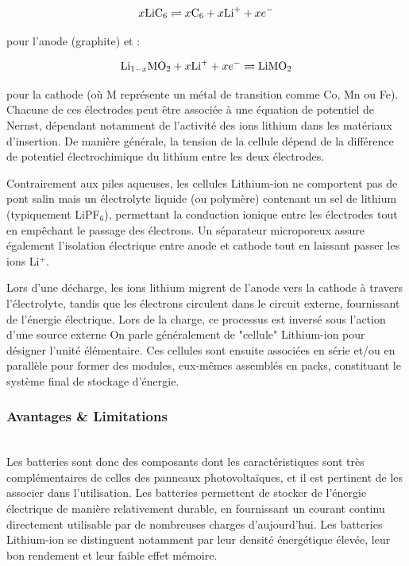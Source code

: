 \begin{equation}
    x\ce{LiC}_6 \rightleftharpoons x\ce{C}_6 + x\ce{Li}^+ + xe^-
\end{equation}

pour l'anode (graphite) et :

\begin{equation}
    \ce{Li}_{1-x}\ce{MO}_2 + x\ce{Li}^+ + xe^- \rightleftharpoons \ce{LiMO}_2
\end{equation}

pour la cathode (où M représente un métal de transition comme Co, Mn ou Fe).
Chacune de ces électrodes peut être associée à une équation de potentiel de Nernst, dépendant notamment de l'activité des ions lithium dans les matériaux d'insertion. De manière générale, la tension de la cellule dépend de la différence de potentiel électrochimique du lithium entre les deux électrodes.

Contrairement aux piles aqueuses, les cellules Lithium-ion ne comportent pas de pont salin mais un électrolyte liquide (ou polymère) contenant un sel de lithium (typiquement LiPF$_6$), permettant la conduction ionique entre les électrodes tout en empêchant le passage des électrons. Un séparateur microporeux assure également l'isolation électrique entre anode et cathode tout en laissant passer les ions Li$^+$.

Lors d'une décharge, les ions lithium migrent de l'anode vers la cathode à travers l'électrolyte, tandis que les électrons circulent dans le circuit externe, fournissant de l'énergie électrique. Lors de la charge, ce processus est inversé sous l'action d'une source externe
On parle généralement de "cellule" Lithium-ion pour désigner l'unité élémentaire. Ces cellules sont ensuite associées en série et/ou en parallèle pour former des modules, eux-mêmes assemblés en packs, constituant le système final de stockage d'énergie.

\subsubsection{Avantages \& Limitations}\hfill \\
Les batteries sont donc des composants dont les caractéristiques sont très complémentaires de celles des panneaux photovoltaïques, et il est pertinent de les associer dans l'utilisation. Les batteries permettent de stocker de l'énergie électrique de manière relativement durable, en fournissant un courant continu directement utilisable par de nombreuses charges d'aujourd'hui. Les batteries Lithium-ion se distinguent notamment par leur densité énergétique élevée, leur bon rendement et leur faible effet mémoire.

